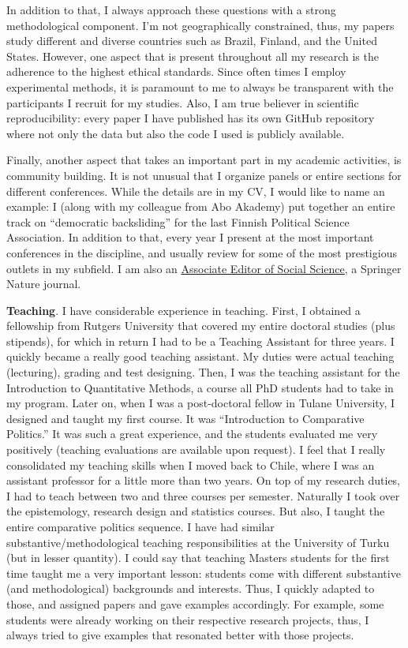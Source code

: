 \documentclass[10pt,stdletter,dateno,sigleft]{newlfm} %
\begin{document}
\begin{newlfm}
In addition to that, I always approach these questions with a strong methodological component. I'm not geographically constrained, thus, my papers study different and diverse countries such as Brazil, Finland, and the United States. However, one aspect that is present throughout all my research is the adherence to the highest ethical standards. Since often times I employ experimental methods, it is paramount to me to always be transparent with the participants I recruit for my studies. Also, I am true believer in scientific reproducibility: every paper I have published has its own GitHub repository where not only the data but also the code I used is publicly available. 

Finally, another aspect that takes an important part in my academic activities, is community building. It is not unusual that I organize panels or entire sections for different conferences. While the details are in my CV, I would like to name an example: I (along with my colleague from Abo Akademy) put together an entire track on ``democratic backsliding'' for the last Finnish Political Science Association. In addition to that, every year I present at the most important conferences in the discipline, and usually review for some of the most prestigious outlets in my subfield. I am also an \href{https://www.springer.com/journal/43545/editors}{Associate Editor of Social Science}, a Springer Nature journal.

{\bf Teaching}. I have considerable experience in teaching. First, I obtained a fellowship from Rutgers University that covered my entire doctoral studies (plus stipends), for which in return I had to be a Teaching Assistant for three years. I quickly became a really good teaching assistant. My duties were actual teaching (lecturing), grading and test designing. Then, I was the teaching assistant for the Introduction to Quantitative Methods, a course all PhD students had to take in my program. Later on, when I was a post-doctoral fellow in Tulane University, I designed and taught my first course. It was ``Introduction to Comparative Politics.'' It was such a great experience, and the students evaluated me very positively (teaching evaluations are available upon request). I feel that I really consolidated my teaching skills when I moved back to Chile, where I was an assistant professor for a little more than two years. On top of my research duties, I had to teach between two and three courses per semester. Naturally I took over the epistemology, research design and statistics courses. But also, I taught the entire comparative politics sequence. I have had similar substantive/methodological teaching responsibilities at the University of Turku (but in lesser quantity). I could say that teaching Masters students for the first time taught me a very important lesson: students come with different substantive (and methodological) backgrounds and interests. Thus, I quickly adapted to those, and assigned papers and gave examples accordingly. For example, some students were already working on their respective research projects, thus, I always tried to give examples that resonated better with those projects.


\end{newlfm}
\end{document}
